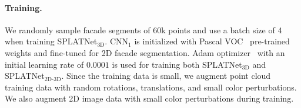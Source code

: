 \documentclass[10pt,twocolumn,letterpaper]{article}
\def\modelthree{SPLATNet$_{\text{3D}}$\xspace}
\def\modeljoint{SPLATNet$_{\text{2D-3D}}$\xspace}
\newcommand{\vjcomment}[1]{{\bf \textcolor{red}{VJ: #1}}}
\begin{document}
\vspace{-0.3cm}\paragraph{Training.} We randomly sample facade segments of 60k points and use a batch size of 4 when 
training \modelthree. 
CNN$_1$ is initialized with Pascal VOC~\cite{Everingham15} pre-trained weights 
and fine-tuned for 2D 
facade segmentation.
Adam optimizer~\cite{kingma2014adam} with an initial learning rate 
of $0.0001$ is used for training both \modelthree and \modeljoint. 
Since the training data is small, we augment point cloud training data with random rotations, 
translations, and small color perturbations. We also augment 2D image data with small color 
perturbations during training.
\end{document}
